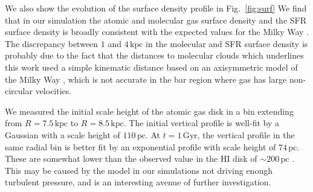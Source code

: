 \documentclass[twocolumn,linenumbers,trackchanges]{aastex631}
\begin{document}
We also show the evolution of the surface density profile in Fig.~\ref{fig:surf}
We find that in our simulation the atomic and molecular gas surface density and
the SFR surface density is broadly consistent with the expected values for the
Milky Way \citep{2008AA...487..951K,2022ApJ...929L..18E}. The discrepancy between
$1$ and $4\,\textrm{kpc}$ in the molecular and SFR surface density is probably due
to the fact that the distances to molecular clouds which underlines this work
used a simple kinematic distance based on an axisymmetric model of the Milky
Way \citep{2017ApJ...834...57M}, which is not accurate in the bar region where gas
has large non-circular velocities.

We measured the initial scale height of the atomic gas disk in a bin
extending from $R=7.5\,\textrm{kpc}$ to $R=8.5\,\textrm{kpc}$. The initial
vertical profile is well-fit by a Gaussian with a scale height of
$110\,\textrm{pc}$. At $t=1\,\textrm{Gyr}$, the vertical profile in the same
radial bin is better fit by an exponential profile with scale height of
$74\,\textrm{pc}$. These are somewhat lower than the observed value in the HI
disk of $\sim200\,\textrm{pc}$ \citep{1995ApJ...448..138M, 2017AA...607A.106M}.
This may be caused by the model in our simulations not driving enough turbulent
pressure, and is an interesting avenue of further investigation.
\end{document}
